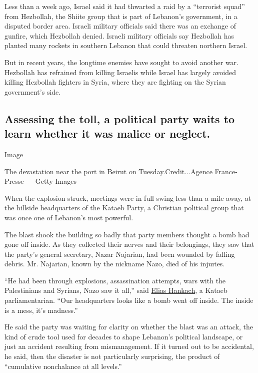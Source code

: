 Less than a week ago, Israel said it had thwarted a raid by a
``terrorist squad'' from Hezbollah, the Shiite group that is part of
Lebanon's government, in a disputed border area. Israeli military
officials said there was an exchange of gunfire, which Hezbollah denied.
Israeli military officials say Hezbollah has planted many rockets in
southern Lebanon that could threaten northern Israel.

But in recent years, the longtime enemies have sought to avoid another
war. Hezbollah has refrained from killing Israelis while Israel has
largely avoided killing Hezbollah fighters in Syria, where they are
fighting on the Syrian government's side.

\hypertarget{assessing-the-toll-a-political-party-waits-to-learn-whether-it-was-malice-or-neglect}{%
\subsection{Assessing the toll, a political party waits to learn whether
it was malice or
neglect.}\label{assessing-the-toll-a-political-party-waits-to-learn-whether-it-was-malice-or-neglect}}

Image

The devastation near the port in Beirut on Tuesday.Credit...Agence
France-Presse --- Getty Images

When the explosion struck, meetings were in full swing less than a mile
away, at the hillside headquarters of the Kataeb Party, a Christian
political group that was once one of Lebanon's most powerful.

The blast shook the building so badly that party members thought a bomb
had gone off inside. As they collected their nerves and their
belongings, they saw that the party's general secretary, Nazar Najarian,
had been wounded by falling debris. Mr. Najarian, known by the nickname
Nazo, died of his injuries.

``He had been through explosions, assassination attempts, wars with the
Palestinians and Syrians, Nazo saw it all,'' said
\href{https://www.facebookcorewwwi.onion/EliasHankach2018/}{Elias
Hankach}, a Kataeb parliamentarian. ``Our headquarters looks like a bomb
went off inside. The inside is a mess, it's madness.''

He said the party was waiting for clarity on whether the blast was an
attack, the kind of crude tool used for decades to shape Lebanon's
political landscape, or just an accident resulting from mismanagement.
If it turned out to be accidental, he said, then the disaster is not
particularly surprising, the product of ``cumulative nonchalance at all
levels.''

